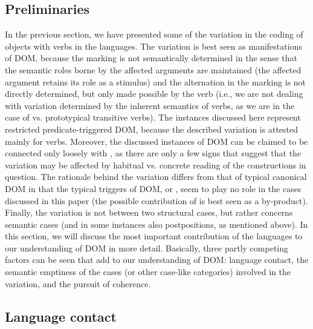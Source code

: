 \documentclass[output=paper]{LSP/langsci}
\begin{document}
\subsection{Preliminaries}
\label{16-ki-sec:4-1}

In the previous section, we have presented some of the variation in the coding of objects with  verbs in the  languages. The variation is best seen as manifestations of DOM, because the marking is not semantically determined in the sense that the semantic roles borne by the affected arguments are maintained (the affected argument retains its role as a stimulus) and the alternation in the marking is not directly determined, but only made possible by the verb (i.e., we are not dealing with variation determined by the inherent semantics of verbs, as we are in the case of  vs. prototypical transitive verbs). The instances discussed here represent restricted predicate-triggered DOM, because the described variation is attested mainly for  verbs. Moreover, the discussed instances of DOM can be claimed to be connected only loosely with , as there are only a few signs that suggest that the variation may be affected by habitual vs. concrete reading of the constructions in question. The rationale behind the variation differs from that of typical canonical DOM in that the typical triggers of DOM,  or , seem to play no role in the cases discussed in this paper (the possible contribution of  is best seen as a by-product). Finally, the variation is not between two structural cases, but rather concerns semantic cases (and in some instances also postpositions, as mentioned above). In this section, we will discuss the most important contribution of the  languages to our understanding of DOM in more detail. Basically, three partly competing factors can be seen that add to our understanding of DOM: language contact, the semantic emptiness of the cases (or other case-like categories) involved in the variation, and the pursuit of coherence.

\subsection{Language contact}
\label{16-ki-sec:4-2}
\end{document}
